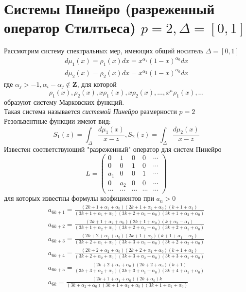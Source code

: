 \documentclass{report}
\begin{document}
\section{Системы Пинейро (разреженный оператор Стилтьеса) $p=2, \Delta=[0,1]$}
Рассмотрим систему спектральныx мер, имеющих общий носитель $\Delta=[0,1]$
$$
\begin{array}{llll}
d\mu_1(x)=\rho_1(x) dx = x^{\alpha_1}(1-x)^{\alpha_0} dx \\
d\mu_2(x)=\rho_2(x) dx = x^{\alpha_2}(1-x)^{\alpha_0} dx
\end{array}
$$
где $\alpha_j>-1, \alpha_i-\alpha_j \not \in \textbf {Z}$, для которой  
$$
\rho_1(x), \rho_2(x), x\rho_1(x), x\rho_2(x), \ldots, x^n\rho_1(x), \ldots
$$
образуют систему Марковских функций. \\
Такая система называется \emph {системой Пинейро}  размерности $p=2$ \\
Резольвентные функции имеют вид:
$$
S_1(z)=\int_{\Delta} {\displaystyle \frac{d\mu_1(x)}{x-z}}, S_2(z)=\int_{\Delta} {\displaystyle \frac{d\mu_2(x)}{x-z}}
$$
Известен соответствующий "разреженный" оператор для систем Пинейро
\begin{equation}
L = \left(\begin{array}{ccccccc}
0 & 1 & 0 & 0 & \cdots \\
0 & 0 & 1 & 0 & \cdots \\
a_1 & 0 & 0 & 1 & \cdots \\
0 & a_2 & 0 & 0 & \cdots \\
\cdots & \cdots & \cdots & \cdots & \cdots 
\end{array}\right)
\end{equation}
для которых известны формулы коэфициентов при $a_n>0$ 
$$
\begin{array}{lllllllllllllll}
a_{6k+1}=\displaystyle
\frac
{(2k+1+\alpha_1+\alpha_0)(2k+1+\alpha_2+\alpha_0)(k+1+\alpha_1)}
{(3k+1+\alpha_1+\alpha_0)(3k+2+\alpha_1+\alpha_0)(3k+1+\alpha_2+\alpha_0)}
\\
a_{6k+2}=\displaystyle\frac
{(2k+1+\alpha_2+\alpha_0)(2k+1+\alpha_0)(k+\alpha_2-\alpha_1)}
{(3k+1+\alpha_2+\alpha_0)(3k+2+\alpha_2+\alpha_0)(3k+2+\alpha_1+\alpha_0)}
\\
a_{6k+3}=\displaystyle\frac
{(2k+2+\alpha_1+\alpha_0)(2k+1+\alpha_0)(k+1+\alpha_1-\alpha_2)}
{(3k+2+\alpha_1+\alpha_0)(3k+3+\alpha_1+\alpha_0)(3k+2+\alpha_2+\alpha_0)}
\\
a_{6k+4}=\displaystyle\frac
{(2k+2+\alpha_2+\alpha_0)(2k+2+\alpha_1+\alpha_0)(k+1+\alpha_2)}
{(3k+2+\alpha_2+\alpha_0)(3k+3+\alpha_2+\alpha_0)(3k+3+\alpha_1+\alpha_0)}
\\
a_{6k+5}=\displaystyle\frac
{(2k+2+\alpha_2+\alpha_0)(2k+2+\alpha_0)(k+1)}
{(3k+3+\alpha_2+\alpha_0)(3k+3+\alpha_1+\alpha_0)(3k+4+\alpha_1+\alpha_0)}
\\
a_{6k}=\displaystyle\frac {(2k+1+\alpha_1+\alpha_0)(2k+\alpha_0)k}
{(3k+\alpha_2+\alpha_0)(3k+1+\alpha_2+\alpha_0)(3k+1+\alpha_1+\alpha_0)}
\end{array}
$$
\end{document}
